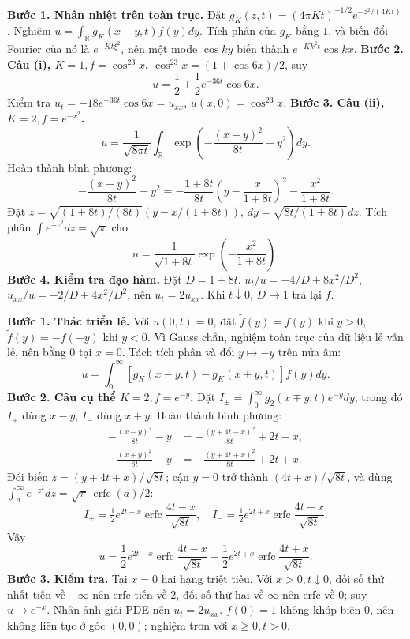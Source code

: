 \textbf{Bước 1. Nhân nhiệt trên toàn trục.}
Đặt $g_K(z,t)=(4\pi Kt)^{-1/2}e^{-z^2/(4Kt)}$. Nghiệm $u=\int_{\mathbb R}g_K(x-y,t)f(y)dy$. Tích phân của $g_K$ bằng $1$, và biến đổi Fourier của nó là $e^{-Kt\xi^2}$, nên một mode $\cos ky$ biến thành $e^{-Kk^2t}\cos kx$.
\textbf{Bước 2. Câu (i), $K=1,f=\cos^23x$.}
$\cos^23x=(1+\cos6x)/2$, suy
\[u=\frac12+\frac12e^{-36t}\cos6x.\]
Kiểm tra $u_t=-18e^{-36t}\cos6x=u_{xx}$, $u(x,0)=\cos^23x$.
\textbf{Bước 3. Câu (ii), $K=2,f=e^{-x^2}$.}
\[u=\frac1{\sqrt{8\pi t}}\int_{\mathbb R}
\exp\left(-\frac{(x-y)^2}{8t}-y^2\right)dy.\]
Hoàn thành bình phương:
\[-\frac{(x-y)^2}{8t}-y^2
=-\frac{1+8t}{8t}\left(y-\frac{x}{1+8t}\right)^2-\frac{x^2}{1+8t}.\]
Đặt $z=\sqrt{(1+8t)/(8t)}(y-x/(1+8t))$, $dy=\sqrt{8t/(1+8t)}dz$. Tích phân $\int e^{-z^2}dz=\sqrt\pi$ cho
\[u=\frac1{\sqrt{1+8t}}\exp\left(-\frac{x^2}{1+8t}\right).\]
\textbf{Bước 4. Kiểm tra đạo hàm.} Đặt $D=1+8t$. $u_t/u=-4/D+8x^2/D^2$, $u_{xx}/u=-2/D+4x^2/D^2$, nên $u_t=2u_{xx}$. Khi $t\downarrow0$, $D\to1$ trả lại $f$.

\textbf{Bước 1. Thác triển lẻ.}
Với $u(0,t)=0$, đặt $\widetilde f(y)=f(y)$ khi $y>0$, $\widetilde f(y)=-f(-y)$ khi $y<0$. Vì Gauss chẵn, nghiệm toàn trục của dữ liệu lẻ vẫn lẻ, nên bằng $0$ tại $x=0$. Tách tích phân và đổi $y\mapsto-y$ trên nửa âm:
\[u=\int_0^\infty[g_K(x-y,t)-g_K(x+y,t)]f(y)dy.\]
\textbf{Bước 2. Câu cụ thể $K=2,f=e^{-y}$.}
Đặt $I_\pm=\int_0^\infty g_2(x\mp y,t)e^{-y}dy$, trong đó $I_+$ dùng $x-y$, $I_-$ dùng $x+y$. Hoàn thành bình phương:
\begin{align*}
-\frac{(x-y)^2}{8t}-y&=-\frac{(y+4t-x)^2}{8t}+2t-x,\\
-\frac{(x+y)^2}{8t}-y&=-\frac{(y+4t+x)^2}{8t}+2t+x.
\end{align*}
Đổi biến $z=(y+4t\mp x)/\sqrt{8t}$; cận $y=0$ trở thành $(4t\mp x)/\sqrt{8t}$, và dùng $\int_a^\infty e^{-z^2}dz=\sqrt\pi\,\operatorname{erfc}(a)/2$:
\[I_+=\tfrac12e^{2t-x}\operatorname{erfc}\frac{4t-x}{\sqrt{8t}},\quad
I_-=\tfrac12e^{2t+x}\operatorname{erfc}\frac{4t+x}{\sqrt{8t}}.\]
Vậy
\[u=\frac12e^{2t-x}\operatorname{erfc}\frac{4t-x}{\sqrt{8t}}
-\frac12e^{2t+x}\operatorname{erfc}\frac{4t+x}{\sqrt{8t}}.\]
\textbf{Bước 3. Kiểm tra.} Tại $x=0$ hai hạng triệt tiêu. Với $x>0,t\downarrow0$, đối số thứ nhất tiến về $-\infty$ nên erfc tiến về $2$, đối số thứ hai về $\infty$ nên erfc về $0$; suy $u\to e^{-x}$. Nhân ảnh giải PDE nên $u_t=2u_{xx}$. $f(0)=1$ không khớp biên $0$, nên không liên tục ở góc $(0,0)$; nghiệm trơn với $x\ge0,t>0$.

